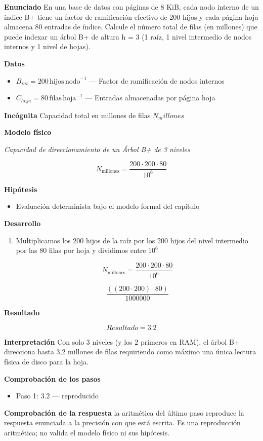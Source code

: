 \documentclass{book}
\begin{document}
\begin{tcolorbox}[title={Problema resuelto}, studiumworked, breakable]

\noindent\textbf{Enunciado}
En una base de datos con páginas de 8 KiB, cada nodo interno de un índice B+ tiene un factor de ramificación efectivo de 200 hijos y cada página hoja almacena 80 entradas de índice. Calcule el número total de filas (en millones) que puede indexar un árbol B+ de altura h = 3 (1 raíz, 1 nivel intermedio de nodos internos y 1 nivel de hojas).

\noindent\textbf{Datos}
\begin{itemize}
\item $B_{int} = 200\,\mathrm{hijos}\,\mathrm{nodo}^{-1}$ — Factor de ramificación de nodos internos
\item $C_{hoja} = 80\,\mathrm{filas}\,\mathrm{hoja}^{-1}$ — Entradas almacenadas por página hoja
\end{itemize}

\noindent\textbf{Incógnita}
Capacidad total en millones de filas \(N_millones\)

\noindent\textbf{Modelo físico}

\noindent\textit{Capacidad de direccionamiento de un Árbol B+ de 3 niveles}

\[
N_{\text{millones}} = \frac{200 \cdot 200 \cdot 80}{10^6}
\]

\noindent\textbf{Hipótesis}
\begin{itemize}
\item Evaluación determinista bajo el modelo formal del capítulo
\end{itemize}

\noindent\textbf{Desarrollo}
\begin{enumerate}
\item
Multiplicamos los 200 hijos de la raíz por los 200 hijos del nivel intermedio por las 80 filas por hoja y dividimos entre \(10^6\)

\[
N_{\text{millones}} = \frac{200 \cdot 200 \cdot 80}{10^6}
\]

\[
\frac{\left(\left(200\cdot 200\right)\cdot 80\right)}{1000000}
\]
\end{enumerate}

\noindent\textbf{Resultado}

\[
Resultado = 3.2
\]

\noindent\textbf{Interpretación}
Con solo 3 niveles (y los 2 primeros en RAM), el árbol B+ direcciona hasta 3,2 millones de filas requiriendo como máximo una única lectura física de disco para la hoja.

\noindent\textbf{Comprobación de los pasos}
\begin{itemize}
\item Paso 1: $3.2$ — reproducido
\end{itemize}

\noindent\textbf{Comprobación de la respuesta} la aritmética del último paso reproduce la respuesta enunciada a la precisión con que está escrita. Es una reproducción aritmética; no valida el modelo físico ni sus hipótesis.
\end{tcolorbox}
\end{document}
